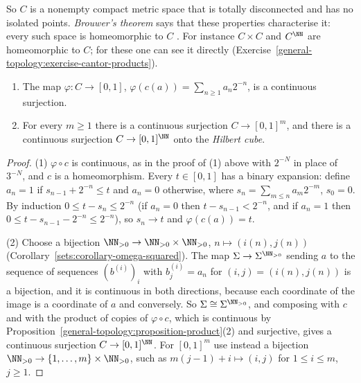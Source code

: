 So $C$ is a nonempty compact metric space that is totally disconnected and has no isolated points. \emph{Brouwer's theorem} says that these properties characterise it: every such space is homeomorphic
to $C$ \cite{kechris-1995}. For instance $C \times C$ and $C^\NN$ are homeomorphic to $C$; for these one can see it directly (Exercise~\ref{general-topology:exercise-cantor-products}).

\begin{proposition}\label{general-topology:proposition-cantor-surjections}
\begin{enumerate}
\item The map $\varphi \colon C \to [0, 1]$, $\varphi(c(a)) = \sum_{n \geq 1}a_n2^{-n}$, is a continuous surjection.
\item For every $m \geq 1$ there is a continuous surjection $C \to [0, 1]^m$, and there is a continuous surjection $C \to [0, 1]^\NN$ onto the \emph{Hilbert cube}.
\end{enumerate}
\end{proposition}

\begin{proof}
(1) $\varphi \circ c$ is continuous, as in the proof of (1) above with $2^{-N}$ in place of $3^{-N}$, and $c$ is a homeomorphism. Every $t \in [0, 1]$ has a binary expansion: define $a_n = 1$ if
$s_{n-1} + 2^{-n} \leq t$ and $a_n = 0$ otherwise, where $s_n = \sum_{m \leq n}a_m2^{-m}$, $s_0 = 0$. By induction $0 \leq t - s_n \leq 2^{-n}$ (if $a_n = 0$ then $t - s_{n-1} < 2^{-n}$, and if $a_n = 1$ then
$0 \leq t - s_{n-1} - 2^{-n} \leq 2^{-n}$), so $s_n \to t$ and $\varphi(c(a)) = t$.

(2) Choose a bijection $\NN_{>0} \to \NN_{>0} \times \NN_{>0}$, $n \mapsto (i(n), j(n))$ (Corollary~\ref{sets:corollary-omega-squared}). The map $\Sigma \to \Sigma^{\NN_{>0}}$ sending $a$ to the sequence of sequences
$(b^{(i)})_i$ with $b^{(i)}_j = a_n$ for $(i, j) = (i(n), j(n))$ is a bijection, and it is continuous in both directions, because each coordinate of the image is a coordinate of $a$ and conversely. So
$\Sigma \cong \Sigma^{\NN_{>0}}$, and composing with $c$ and with the product of copies of $\varphi \circ c$, which is continuous by Proposition~\ref{general-topology:proposition-product}(2) and surjective,
gives a continuous surjection $C \to [0, 1]^\NN$. For $[0, 1]^m$ use instead a bijection $\NN_{>0} \to \{1, \ldots, m\} \times \NN_{>0}$, such as $m(j - 1) + i \mapsto (i, j)$ for $1 \leq i \leq m$, $j \geq 1$.
\end{proof}

